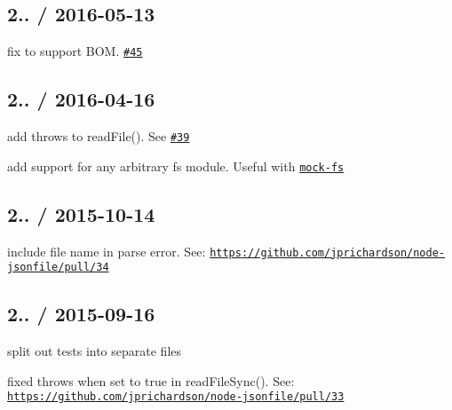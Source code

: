 \subsection*{2.. / 2016-\/05-\/13 }


\begin{DoxyItemize}
\item fix to support B\+OM. \href{https://github.com/jprichardson/node-jsonfile/issues/45}{\tt \#45}
\end{DoxyItemize}

\subsection*{2.. / 2016-\/04-\/16 }


\begin{DoxyItemize}
\item add {\ttfamily throws} to {\ttfamily read\+File()}. See \href{https://github.com/jprichardson/node-jsonfile/pull/39}{\tt \#39}
\item add support for any arbitrary {\ttfamily fs} module. Useful with \href{https://www.npmjs.com/package/mock-fs}{\tt mock-\/fs}
\end{DoxyItemize}

\subsection*{2.. / 2015-\/10-\/14 }


\begin{DoxyItemize}
\item include file name in parse error. See\+: \href{https://github.com/jprichardson/node-jsonfile/pull/34}{\tt https\+://github.\+com/jprichardson/node-\/jsonfile/pull/34}
\end{DoxyItemize}

\subsection*{2.. / 2015-\/09-\/16 }


\begin{DoxyItemize}
\item split out tests into separate files
\item fixed {\ttfamily throws} when set to {\ttfamily true} in {\ttfamily read\+File\+Sync()}. See\+: \href{https://github.com/jprichardson/node-jsonfile/pull/33}{\tt https\+://github.\+com/jprichardson/node-\/jsonfile/pull/33}
\end{DoxyItemize}

